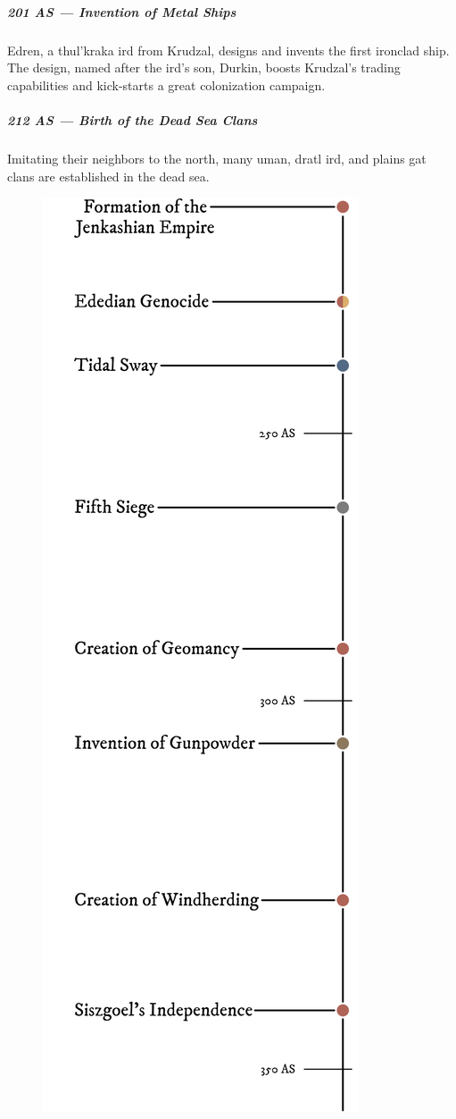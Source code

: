 \subparagraph{201 AS --- Invention of Metal Ships} Edren, a thul'kraka ird from Krudzal, designs and invents the first ironclad ship.
The design, named after the ird's son, Durkin, boosts Krudzal's trading capabilities and kick-starts a great colonization campaign.

\subparagraph{212 AS --- Birth of the Dead Sea Clans} Imitating their neighbors to the north, many uman, dratl ird, and plains gat clans are established in the dead sea.


\begin{figure}[H]
    \centering \includegraphics{01yuadrem/img/30history_iv.png}
\end{figure}

